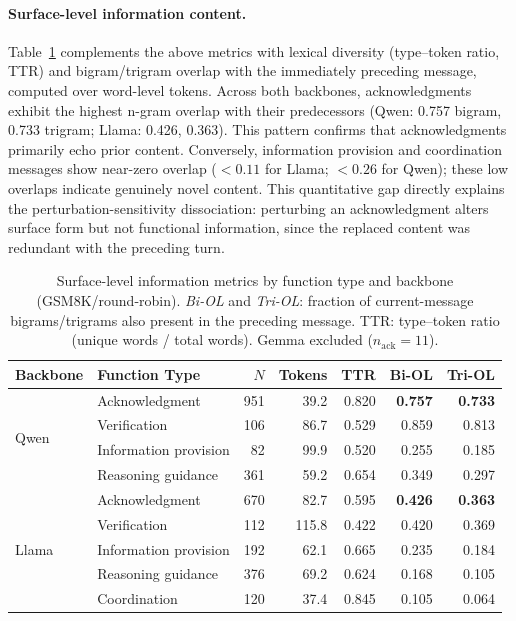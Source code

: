 \paragraph{Surface-level information content.}
Table~\ref{tab:surface_info} complements the above metrics with lexical diversity (type--token ratio, TTR) and bigram/trigram overlap with the immediately preceding message, computed over word-level tokens.
Across both backbones, acknowledgments exhibit the highest n-gram overlap with their predecessors (Qwen: 0.757 bigram, 0.733 trigram; Llama: 0.426, 0.363). This pattern confirms that acknowledgments primarily echo prior content.
Conversely, information provision and coordination messages show near-zero overlap ($< 0.11$ for Llama; $< 0.26$ for Qwen); these low overlaps indicate genuinely novel content.
This quantitative gap directly explains the perturbation-sensitivity dissociation: perturbing an acknowledgment alters surface form but not functional information, since the replaced content was redundant with the preceding turn.

\begin{table}[ht]
\centering
\caption{Surface-level information metrics by function type and backbone (GSM8K/round-robin). \textit{Bi-OL} and \textit{Tri-OL}: fraction of current-message bigrams/trigrams also present in the preceding message. TTR: type--token ratio (unique words / total words). Gemma excluded ($n_\text{ack} = 11$).}
\label{tab:surface_info}
\small
\begin{tabular}{@{}llrrrrr@{}}
\toprule
\textbf{Backbone} & \textbf{Function Type} & \textbf{$N$} & \textbf{Tokens} & \textbf{TTR} & \textbf{Bi-OL} & \textbf{Tri-OL} \\
\midrule
\multirow{4}{*}{Qwen}
  & Acknowledgment        & 951 & 39.2  & 0.820 & \textbf{0.757} & \textbf{0.733} \\
  & Verification          & 106 & 86.7  & 0.529 & 0.859 & 0.813 \\
  & Information provision  &  82 & 99.9  & 0.520 & 0.255 & 0.185 \\
  & Reasoning guidance    & 361 & 59.2  & 0.654 & 0.349 & 0.297 \\
\midrule
\multirow{5}{*}{Llama}
  & Acknowledgment        & 670 & 82.7  & 0.595 & \textbf{0.426} & \textbf{0.363} \\
  & Verification          & 112 & 115.8 & 0.422 & 0.420 & 0.369 \\
  & Information provision  & 192 & 62.1  & 0.665 & 0.235 & 0.184 \\
  & Reasoning guidance    & 376 & 69.2  & 0.624 & 0.168 & 0.105 \\
  & Coordination          & 120 & 37.4  & 0.845 & 0.105 & 0.064 \\
\bottomrule
\end{tabular}
\end{table}


